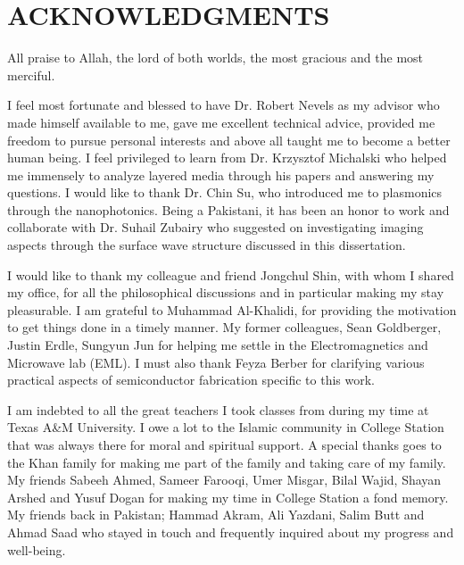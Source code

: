 %
%
%


\chapter*{ACKNOWLEDGMENTS}


\indent

All praise to Allah, the lord of both worlds, the most gracious and the most merciful.

I feel most fortunate and blessed to have Dr. Robert Nevels as my advisor who  made himself available to me, gave me excellent technical advice, provided me freedom to pursue personal interests and above all taught me to become a better human being. I feel privileged to learn from Dr. Krzysztof Michalski who helped me immensely to analyze layered media through his papers and answering my questions. I would like to thank Dr. Chin Su, who introduced me to plasmonics through the nanophotonics. Being a Pakistani, it has been an honor to work and collaborate with Dr. Suhail Zubairy who suggested on investigating imaging aspects through the surface wave structure discussed in this dissertation.

I would like to thank my colleague and friend Jongchul Shin, with whom I shared my office, for all the philosophical discussions and in particular making my stay pleasurable. I am grateful to Muhammad Al-Khalidi, for providing the motivation to get things done in a timely manner. My former colleagues, Sean Goldberger, Justin Erdle, Sungyun Jun for helping me settle in the Electromagnetics and Microwave lab (EML). I must also thank Feyza Berber for clarifying various practical aspects of semiconductor fabrication specific to this work.

I am indebted to all the great teachers I took classes from during my time at Texas A\&M University. I owe a lot to the Islamic community in College Station that was always there for moral and spiritual support. A special thanks goes to the Khan family for making me part of the family and taking care of my family. My friends Sabeeh Ahmed, Sameer Farooqi, Umer Misgar, Bilal Wajid, Shayan Arshed and Yusuf Dogan for making my time in College Station a fond memory. My friends back in Pakistan; Hammad Akram, Ali Yazdani, Salim Butt and Ahmad Saad who stayed in touch and frequently inquired about my progress and well-being.

